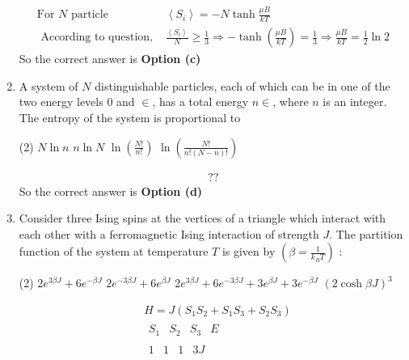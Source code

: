 \begin{enumerate}
\begin{answer}
\begin{align*}
	\text{For $N$ particle }&\left\langle S_{i}\right\rangle=-N \tanh \frac{\mu B}{k T}\\
\text{	According to question, }&\frac{\left\langle S_{i}\right\rangle}{N} \geq \frac{1}{3} \Rightarrow-\tanh \left(\frac{\mu B}{k T}\right)=\frac{1}{3} \Rightarrow \frac{\mu B}{k T}=\frac{1}{2} \ln 2
	\end{align*}
		So the correct answer is \textbf{Option (c)}
\end{answer}
	\item A system of $N$ distinguishable particles, each of which can be in one of the two energy levels 0 and $\in$, has a total energy $n \in$, where $n$ is an integer. The entropy of the system is proportional to
	{	}
	 \begin{tasks}(2)
		\task[\textbf{a.}]$N \ln n$
		\task[\textbf{b.}]$n \ln N$
		\task[\textbf{c.}] $\ln \left(\frac{N !}{n !}\right)$
		\task[\textbf{d.}] $\ln \left(\frac{N !}{n !(N-n) !}\right)$
	\end{tasks}
\begin{answer}
	\begin{align*}
	??
	\end{align*}
	So the correct answer is \textbf{Option (d)}
\end{answer}
\item Consider three Ising spins at the vertices of a triangle which interact with each other with a ferromagnetic Ising interaction of strength $J$. The partition function of the system at temperature $T$ is given by $\left(\beta=\frac{1}{k_{B} T}\right)$ :
{	}
 \begin{tasks}(2)
	\task[\textbf{a.}] $2 e^{3 \beta J}+6 e^{-\beta J}$
	\task[\textbf{b.}] $2 e^{-3 \beta J}+6 e^{\beta J}$
	\task[\textbf{c.}]$2 e^{3 \beta J}+6 e^{-3 \beta J}+3 e^{\beta J}+3 e^{-\beta J}$
	\task[\textbf{d.}] $(2 \cosh \beta J)^{3}$
\end{tasks}
\begin{answer}
	\begin{align*}
	&H=J\left(S_{1} S_{2}+S_{1} S_{3}+S_{2} S_{3}\right)\\
	&\begin{array}{llll}
	S_{1} & S_{2} & S_{3} & E
	\end{array}\\
	&\begin{array}{llll}
	1 & 1 & 1 & 3 J
	\end{array}\\
	&\left.\begin{array}{ccc}

\end{array}
\end{align*}
\end{answer}
\end{enumerate}
